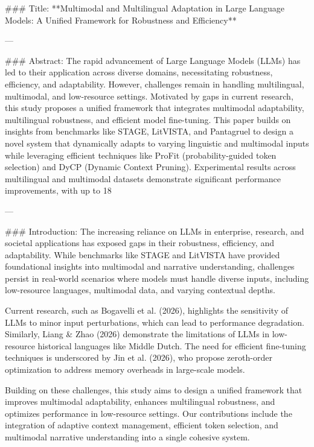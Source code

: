 ### Title:
**Multimodal and Multilingual Adaptation in Large Language Models: A Unified Framework for Robustness and Efficiency**

---

### Abstract:
The rapid advancement of Large Language Models (LLMs) has led to their application across diverse domains, necessitating robustness, efficiency, and adaptability. However, challenges remain in handling multilingual, multimodal, and low-resource settings. Motivated by gaps in current research, this study proposes a unified framework that integrates multimodal adaptability, multilingual robustness, and efficient model fine-tuning. This paper builds on insights from benchmarks like STAGE, LitVISTA, and Pantagruel to design a novel system that dynamically adapts to varying linguistic and multimodal inputs while leveraging efficient techniques like ProFit (probability-guided token selection) and DyCP (Dynamic Context Pruning). Experimental results across multilingual and multimodal datasets demonstrate significant performance improvements, with up to 18%

---

### Introduction:
The increasing reliance on LLMs in enterprise, research, and societal applications has exposed gaps in their robustness, efficiency, and adaptability. While benchmarks like STAGE and LitVISTA have provided foundational insights into multimodal and narrative understanding, challenges persist in real-world scenarios where models must handle diverse inputs, including low-resource languages, multimodal data, and varying contextual depths.

Current research, such as Bogavelli et al. (2026), highlights the sensitivity of LLMs to minor input perturbations, which can lead to performance degradation. Similarly, Liang & Zhao (2026) demonstrate the limitations of LLMs in low-resource historical languages like Middle Dutch. The need for efficient fine-tuning techniques is underscored by Jin et al. (2026), who propose zeroth-order optimization to address memory overheads in large-scale models.

Building on these challenges, this study aims to design a unified framework that improves multimodal adaptability, enhances multilingual robustness, and optimizes performance in low-resource settings. Our contributions include the integration of adaptive context management, efficient token selection, and multimodal narrative understanding into a single cohesive system.

